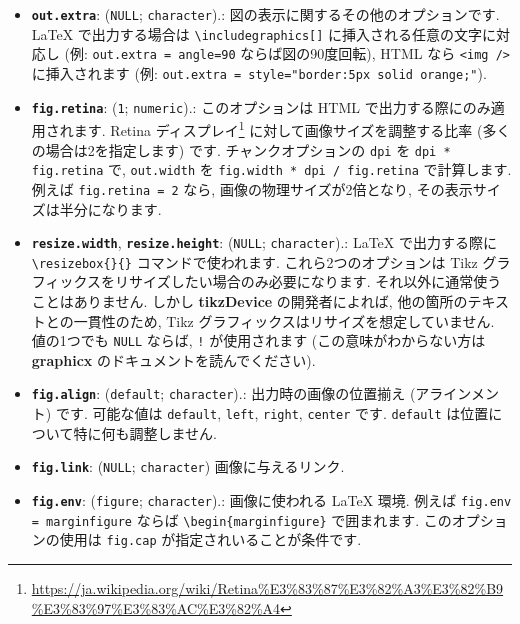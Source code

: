 \documentclass[
  11pt,
]{bxjsreport}
\renewcommand{\href}[2]{#2\footnote{\url{#1}}}
\begin{document}
\begin{itemize}
\item
  \textbf{\texttt{out.extra}}: (\texttt{NULL}; \texttt{character}).: 図の表示に関するその他のオプションです. LaTeX で出力する場合は \texttt{\textbackslash{}includegraphics{[}{]}} に挿入される任意の文字に対応し (例: \texttt{out.extra = \textquotesingle{}angle=90\textquotesingle{}} ならば図の90度回転), HTML なら \texttt{\textless{}img\ /\textgreater{}} に挿入されます (例: \texttt{out.extra = \textquotesingle{}style="border:5px\ solid\ orange;"\textquotesingle{}}).
\item
  \textbf{\texttt{fig.retina}}: (\texttt{1}; \texttt{numeric}).: このオプションは HTML で出力する際にのみ適用されます. \href{https://ja.wikipedia.org/wiki/Retina\%E3\%83\%87\%E3\%82\%A3\%E3\%82\%B9\%E3\%83\%97\%E3\%83\%AC\%E3\%82\%A4}{Retina ディスプレイ} に対して画像サイズを調整する比率 (多くの場合は2を指定します) です. チャンクオプションの \texttt{dpi} を \texttt{dpi * fig.retina} で, \texttt{out.width} を \texttt{fig.width * dpi / fig.retina} で計算します. 例えば \texttt{fig.retina = 2} なら, 画像の物理サイズが2倍となり, その表示サイズは半分になります.
\item
  \textbf{\texttt{resize.width}}, \textbf{\texttt{resize.height}}: (\texttt{NULL}; \texttt{character}).: LaTeX で出力する際に \texttt{\textbackslash{}resizebox\{\}\{\}} コマンドで使われます. これら2つのオプションは Tikz グラフィックスをリサイズしたい場合のみ必要になります. それ以外に通常使うことはありません. しかし \textbf{tikzDevice} の開発者によれば, 他の箇所のテキストとの一貫性のため, Tikz グラフィックスはリサイズを想定していません. 値の1つでも \texttt{NULL} ならば, \texttt{!} が使用されます (この意味がわからない方は \textbf{graphicx} のドキュメントを読んでください).
\item
  \textbf{\texttt{fig.align}}: (\texttt{\textquotesingle{}default\textquotesingle{}}; \texttt{character}).: 出力時の画像の位置揃え (アラインメント) です. 可能な値は \texttt{default}, \texttt{left}, \texttt{right}, \texttt{center} です. \texttt{default} は位置について特に何も調整しません.
\item
  \textbf{\texttt{fig.link}}: (\texttt{NULL}; \texttt{character}) 画像に与えるリンク.
\item
  \textbf{\texttt{fig.env}}: (\texttt{\textquotesingle{}figure\textquotesingle{}}; \texttt{character}).: 画像に使われる LaTeX 環境. 例えば \texttt{fig.env = \textquotesingle{}marginfigure\textquotesingle{}} ならば \texttt{\textbackslash{}begin\{marginfigure\}} で囲まれます. このオプションの使用は \texttt{fig.cap} が指定されいることが条件です.

\end{itemize}
\end{document}
